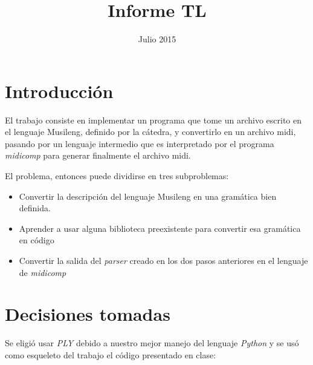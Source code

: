 \documentclass{article}
\title{Informe TL}
\date{Julio 2015}
\begin{document}
\newcommand{\num}{\textit{\textbf{num}}}
\newcommand{\var}{\textit{\textbf{constante}}}



%



\begin{titlepage}
\maketitle
\thispagestyle{empty}
\end{titlepage} 


\section*{Introducción}
El trabajo consiste en implementar un programa que tome un archivo escrito en el lenguaje Musileng,
definido por la cátedra, y convertirlo en un archivo midi, pasando por un lenguaje intermedio que es
interpretado por el programa \emph{midicomp} para generar finalmente el archivo midi.

El problema, entonces puede dividirse en tres subproblemas: 

\begin{itemize}
	\item Convertir la descripción del lenguaje Musileng en una gramática bien definida.
	\item Aprender a usar alguna biblioteca preexistente para convertir esa gramática en código
	\item Convertir la salida del \emph{parser} creado en los dos pasos anteriores en el lenguaje de
		\emph{midicomp}
\end{itemize}

\section*{Decisiones tomadas}
Se eligió usar \emph{PLY} debido a nuestro mejor manejo del lenguaje \emph{Python} y se usó como
esqueleto del trabajo el código presentado en clase:
\end{document}
